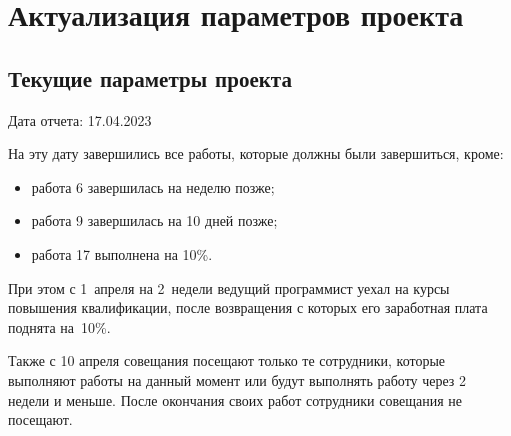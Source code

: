 \clearpage
\section{Актуализация параметров проекта}

\subsection{Текущие параметры проекта}

Дата отчета: 17.04.2023

На эту дату завершились все работы, которые должны были завершиться, кроме:

\begin{itemize}
    \item работа 6 завершилась на неделю позже;
    \item работа 9 завершилась на 10 дней позже;
    \item работа 17 выполнена на 10\%.
\end{itemize}

При этом с 1~апреля на 2~недели ведущий программист уехал на курсы повышения
квалификации, после возвращения с которых его заработная плата поднята на~10\%.

Также с 10 апреля совещания посещают только те сотрудники, которые выполняют
работы на данный момент или будут выполнять работу через 2 недели и меньше.
После окончания своих работ сотрудники совещания не посещают.


